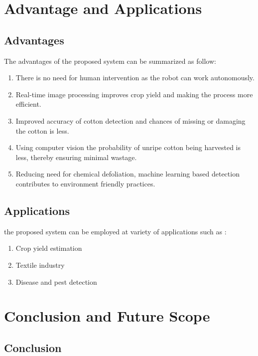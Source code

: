 \documentclass[12pt,a4paper]{report}
\begin{document}
\chapter{Advantage and Applications}


\section{Advantages}
The advantages of the proposed system can be summarized as follow:
\begin{enumerate}
\item There is no need for human intervention as the robot can work autonomously.
\item Real-time image processing improves crop yield and making the process more
efficient.
\item Improved accuracy of cotton detection and chances of missing or damaging the
cotton is less.
\item Using computer vision the probability of unripe cotton being harvested is less,
thereby ensuring minimal wastage.
\item Reducing need for chemical defoliation, machine learning based detection
contributes to environment friendly practices.

\end{enumerate}
\section{Applications}
the proposed system can be employed at variety of applications such as :
\begin{enumerate}
\item Crop yield estimation
\item Textile industry
\item Disease and pest detection
\end{enumerate}

\chapter{ Conclusion and Future Scope}


\section {Conclusion}
\end{document}
